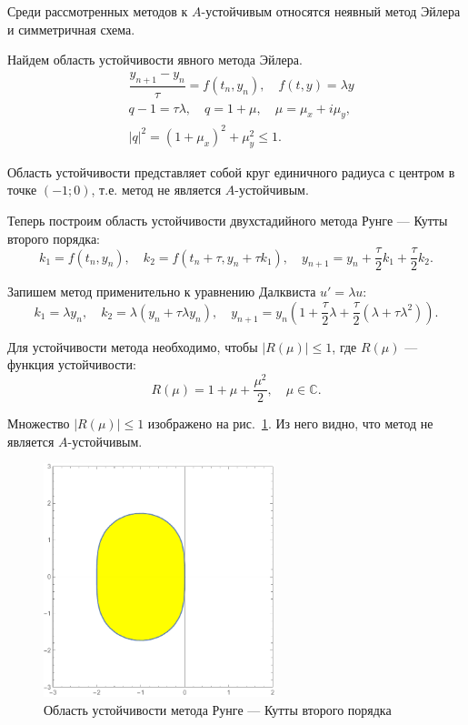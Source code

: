 \documentclass[12pt, a4paper]{article}
\begin{document}
\begin{enumerate}
		
		Среди рассмотренных методов к $A$-устойчивым относятся неявный метод Эйлера и симметричная схема.
		
		
		Найдем область устойчивости явного метода Эйлера.
		\begin{eqnarray*}
			& \dfrac{y_{n+1} - y_n}\tau = f(t_n, y_n), \quad f(t, y) = \lambda y \\
			& q-1 = \tau \lambda, \quad q = 1 + \mu, \quad \mu = \mu_x + i \mu_y, \\
			& |q|^2 = (1+\mu_x)^2 + \mu_y^2 \le 1.
		\end{eqnarray*}
		
		Область устойчивости представляет собой круг единичного радиуса с центром в точке $(-1; 0)$, т.е. метод не является $A$-устойчивым.
		
		Теперь построим область устойчивости двухстадийного метода Рунге --- Кутты второго порядка:
		\[
		k_1 = f(t_n, y_n), \quad k_2 = f(t_n + \tau, y_n + \tau k_1), \quad y_{n+1} = y_n + \frac\tau2 k_1 + \frac\tau2 k_2.
		\]
		
		Запишем метод применительно к уравнению Далквиста $u' = \lambda u$:
		\[
		k_1 = \lambda y_n, \quad k_2 = \lambda \left(y_n + \tau \lambda y_n \right), \quad y_{n+1} = y_n \left(1 + \frac\tau2 \lambda + \frac\tau2 (\lambda + \tau \lambda^2) \right).
		\]
		
		Для устойчивости метода необходимо, чтобы $|R(\mu)| \le 1$, где $R(\mu)$ --- функция устойчивости:
		\[
		R(\mu) = 1 + \mu + \frac{\mu^2}2, \quad \mu \in \mathbb{C}.
		\]
		
		Множество $|R(\mu)| \le 1$ изображено на рис.~\ref{rk2}. Из него видно, что метод не является $A$-устойчивым.
		
		\begin{figure}[H]
			\centering
			\includegraphics[width=0.6\textwidth]{rk2}
			\caption{Область устойчивости метода Рунге --- Кутты второго порядка}
			\label{rk2}
		\end{figure}
		

\end{enumerate}
\end{document}
